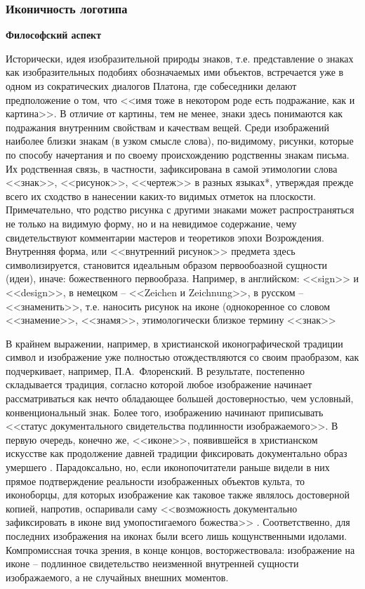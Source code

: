 \subsubsection{Иконичность логотипа}

\textbf{Философский аспект}

Исторически, идея изобразительной природы знаков, т.е. представление о знаках
как изобразительных подобиях обозначаемых ими объектов, встречается уже в
одном из сократических диалогов Платона, где собеседники делают предположение о
том, что <<имя тоже в некотором роде есть подражание, как и картина>>\autocite{kratil2013}. В
отличие от картины, тем  не менее, знаки здесь понимаются как подражания внутренним свойствам и
качествам вещей. Среди изображений наиболее близки знакам (в узком смысле слова), по-видимому,
рисунки, которые по способу начертания и по своему происхождению родственны знакам письма. Их
родственная связь, в частности, зафиксирована в самой этимологии слова <<знак>>, <<рисунок>>,
<<чертеж>> в разных языках*, утверждая прежде всего их сходство в нанесении каких-то видимых отметок на
плоскости. Примечательно, что родство рисунка с другими знаками может распространяться не только на
видимую форму, но и на невидимое содержание, чему свидетельствуют комментарии мастеров и теоретиков
эпохи Возрождения\autocite[][527-535]{zukarro1981}. Внутренняя форма, или <<внутренний
рисунок>> предмета здесь символизируется, становится идеальным образом первообоазной сущности (идеи),
иначе: божественного первообраза. Например, в английском: <<sign>> и <<design>>, в немецком –
<<Zeichen и Zeichnung>>,  в русском – <<знаменить>>, т.е. наносить рисунок на иконе (однокоренное со
словом <<знамение>>, <<знамя>>, этимологически близкое термину <<знак>> \autocite[][140]{chertov1993}

В крайнем выражении, например, в христианской иконографической традиции
символ и изображение уже полностью отождествляются со своим праобразом,
как подчеркивает, например, П.А.~Флоренский\autocite{florensky1995}.
В результате, постепенно складывается традиция, согласно которой любое
изображение начинает рассматриваться как нечто обладающее большей достоверностью,
чем условный, конвенциональный знак. Более того, изображению начинают
приписывать <<статус документального свидетельства подлинности изображаемого>>\autocite[][143]{chertov1993}. В первую очередь, конечно же, <<иконе>>, появившейся в
христианском искусстве как продолжение давней традиции фиксировать документально
образ умершего \autocite{lihachev1971}.
Парадоксально, но, если иконопочитатели раньше видели в них прямое подтверждение
реальности изображенных объектов культа, то иконоборцы, для которых изображение
как таковое также являлось достоверной копией, напротив,  оспаривали саму
<<возможность документально зафиксировать в иконе вид умопостигаемого божества>>
\autocite[][143]{chertov1993}. Соответственно, для последних изображения на иконах были
всего лишь кощунственными идолами. Компромиссная точка зрения, в конце
концов, восторжествовала: изображение на иконе -- подлинное свидетельство
неизменной внутренней сущности изображаемого, а не случайных внешних
моментов\autocite[][18]{lasarev1986, bichkov1989}.

